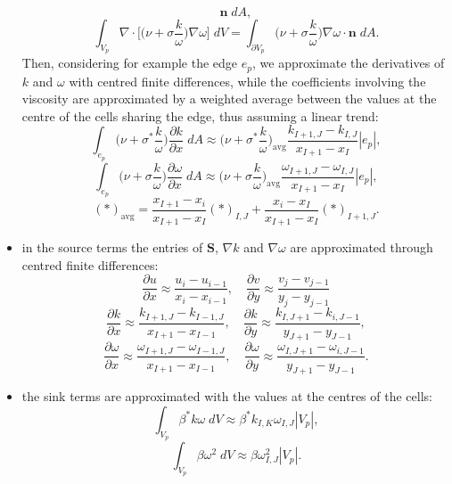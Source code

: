 \begin{itemize}
\begin{equation}
		\mathbf{n} \; dA,
	\end{equation}
	\begin{equation}
	\int_{V_p} \nabla \cdot \bigg[\bigg(\nu + \sigma\frac{k}{\omega}\bigg) 
	\nabla \omega\bigg] \; dV = \int_{\partial V_p} \bigg(\nu + \sigma 
	\frac{k}{\omega}\bigg) \nabla \omega \cdot \mathbf{n} \; dA.
	\end{equation}
	Then, considering for example the edge $e_p$, we approximate the 
	derivatives of $k$ and $\omega$ with centred finite differences, while the 
	coefficients involving the viscosity are approximated by a weighted average 
	between the values at the centre of the cells sharing the edge, thus 
	assuming a linear trend:
	\begin{equation}
	\int_{e_p} \bigg(\nu + \sigma^*\frac{k}{\omega}\bigg) \frac{\partial 
	k}{\partial x} \; dA \approx \bigg(\nu + \sigma^* 
	\frac{k}{\omega}\bigg)_\text{avg} \frac{k_{I+1,J}-k_{I,J}}{x_{I+1}-x_I} 
	|e_p|,
	\end{equation}
	\begin{equation}
	\int_{e_p} \bigg(\nu + \sigma\frac{k}{\omega}\bigg) \frac{\partial 
	\omega}{\partial x} \; dA \approx \bigg(\nu + \sigma 
	\frac{k}{\omega}\bigg)_\text{avg} 
	\frac{\omega_{I+1,J}-\omega_{I,J}}{x_{I+1} - x_I} |e_p|,
	\end{equation}
	\begin{equation}
	(\ast)_\text{avg} = \frac{x_{I+1} - x_i}{x_{I+1} - x_I}(\ast)_{I,J} + 
	\frac{x_i-x_I}{x_{I+1} - x_I}(\ast)_{I+1,J}.
	\end{equation}
	\item in the source terms the entries of $\mathbf{S}$, $\nabla k$ and 
	$\nabla \omega$ are approximated through centred finite differences:
	\begin{equation}
		\frac{\partial u}{\partial x} \approx \frac{u_i-u_{i-1}}{x_i-x_{i-1}}, 
		\quad \frac{\partial v}{\partial y} \approx 
		\frac{v_j-v_{j-1}}{y_j-y_{j-1}}
	\end{equation}
	\begin{equation}
		\frac{\partial k}{\partial x} \approx \frac{k_{I+1,J} - 
		k_{I-1,J}}{x_{I+1} - x_{I-1}}, 
		\quad \frac{\partial k}{\partial y} \approx 
		\frac{k_{I,J+1}-k_{i,J-1}}{y_{J+1}-y_{J-1}},
	\end{equation}
	\begin{equation}
		\frac{\partial \omega}{\partial x} \approx \frac{\omega_{I+1,J} - 
		\omega_{I-1,J}}{x_{I+1} - x_{I-1}}, \quad \frac{\partial 
		\omega}{\partial y} \approx 
		\frac{\omega_{I,J+1}-\omega_{i,J-1}}{y_{J+1}-y_{J-1}}.
	\end{equation}
	\item the sink terms are approximated with the values at the centres of the 
	cells:
	\begin{equation}
		\int_{V_p} \beta^* k \omega \; dV \approx 
		\beta^*k_{I,K}\omega_{I,J}|V_p|,
	\end{equation}
	\begin{equation}
		\int_{V_p} \beta \omega^2 \; dV \approx \beta \omega_{I,J}^2 |V_p|.
	\end{equation}
\end{itemize}
%
